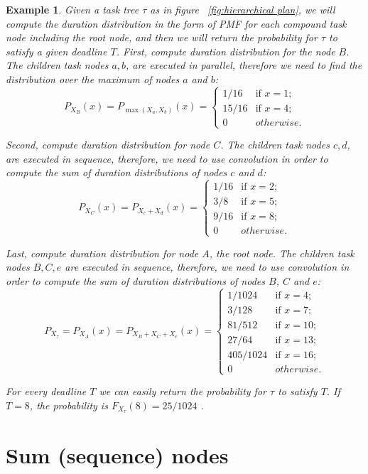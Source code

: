 \documentclass[review]{elsarticle}
\newtheorem{example}{Example}
\begin{document}
\begin{example}

Given a task tree $\tau$ as in figure ~\ref{fig:hierarchical plan}, we will compute the duration distribution in the form of PMF for each compound task node including the root node, and then we will return the probability for $\tau$ to satisfy a given deadline $T$. 
First, compute duration distribution for the node $B$. The children task nodes $a,b$, are executed in parallel, therefore we need to find the distribution over the maximum of nodes $a$ and $b$:  
$$P_{X_B}(x)=P_{\max(X_a,X_b)}(x)=
\begin{cases}
1/16 & \text{if } x=1; \\
15/16 & \text{if } x=4; \\
0 & otherwise.
\end{cases}$$

Second, compute duration distribution for node $C$. The children task nodes $c,d$, are executed in sequence, therefore, we need to use convolution in order to compute the sum of duration distributions of nodes $c$ and $d$:  
$$P_{X_C}(x)=P_{X_c+X_d}(x)=
\begin{cases}
1/16 & \text{if } x=2; \\
3/8 & \text{if } x=5; \\
9/16 & \text{if } x=8; \\
0 & otherwise.
\end{cases}$$

Last, compute duration distribution for node $A$, the root node. The children task nodes $B,C,e$ are executed in sequence, therefore, we need to use convolution in order to compute the sum of duration distributions of nodes $B$, $C$ and $e$: 
$$P_{X_{\tau}}=P_{X_A}(x)=P_{X_B+X_C+X_e}(x)=
\begin{cases}
1/1024 & \text{if } x=4; \\
3/128 & \text{if } x=7; \\
81/512 & \text{if } x=10; \\
27/64 & \text{if } x=13; \\
405/1024 & \text{if } x=16; \\
0 & otherwise.
\end{cases}$$

For every deadline $T$ we can easily return the probability for $\tau$ to satisfy $T$. If $T=8$, the probability is  $F_{X_{\tau}}(8)=25/1024$ . 
\end{example}
 
\section{Sum (sequence) nodes}\label{sec:seq}
\end{document}
